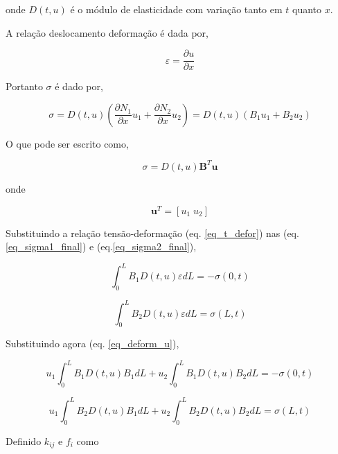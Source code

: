 \documentclass[12pt,a4paper]{article}
\newcommand{\diff}[1]{d#1}
\newcommand{\dd}[2]{\frac{\partial #1}{\partial #2}}
\begin{document}
\noindent
onde $D\left(t,u\right)$ é o módulo de elasticidade com variação tanto em $t$ quanto $x$.

A relação deslocamento deformação é dada por,

\begin{equation}
\varepsilon  = \dd{u}{x}
\end{equation}

Portanto $\sigma$ é dado por,

\begin{equation}
\sigma = D\left(t,u\right) \left(\dd{N_1}{x}u_1 + \dd{N_2}{x}u_2\right) = D\left(t,u\right) \left(B_1 u_1 + B_2 u_2\right)   
\label{eq_deform_u}
\end{equation}

\noindent
O que pode ser escrito como,

\begin{equation}
\sigma = D\left(t,u\right) \mathbf{B}^T \mathbf{u}  
\end{equation}

\noindent
onde

\begin{equation}
\mathbf{u}^T = [u_1\;u_2]  
\end{equation}


Substituindo a relação tensão-deformação (eq. \ref{eq_t_defor}) nas  (eq. \ref{eq_sigma1_final}) e (eq.\ref{eq_sigma2_final}), 

\begin{equation}
\int_0^L B_1 D\left(t,u\right) \varepsilon \diff{L} = - \sigma\left(0,t\right)
\end{equation}

\begin{equation}
\int_0^L B_2 D\left(t,u\right) \varepsilon \diff{L}  = \sigma\left(L,t\right)
\end{equation}

Substituindo agora (eq. \ref{eq_deform_u}),

\begin{equation}
u_1 \int_0^L B_1 D\left(t,u\right) B_1 \diff{L} + u_2 \int_0^L B_1 D\left(t,u\right) B_2 \diff{L} = - \sigma\left(0,t\right)
\end{equation}

\begin{equation}
u_1 \int_0^L B_2 D \left(t,u\right) B_1 \diff{L} + u_2 \int_0^L B_2 D\left(t,u\right) B_2 \diff{L} = \sigma\left(L,t\right)
\end{equation}

Definido $k_{ij}$ e $f_i$ como
\end{document}
